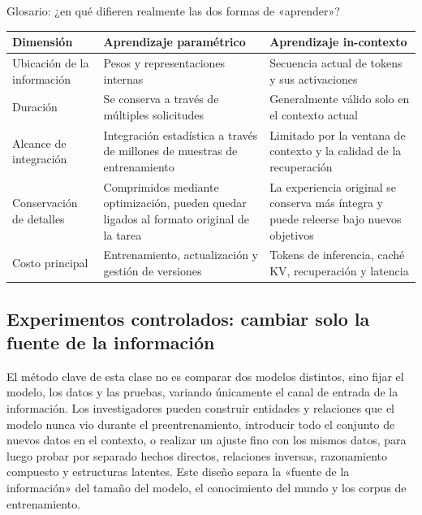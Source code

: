 \begin{knowledgebox}{Glosario: ¿en qué difieren realmente las dos formas de «aprender»?}
\begin{tabularx}{\textwidth}{L{0.22\textwidth}X X}
\toprule
Dimensión & Aprendizaje paramétrico & Aprendizaje in-contexto \\
\midrule
Ubicación de la información & Pesos y representaciones internas & Secuencia actual de tokens y sus activaciones \\
Duración & Se conserva a través de múltiples solicitudes & Generalmente válido solo en el contexto actual \\
Alcance de integración & Integración estadística a través de millones de muestras de entrenamiento & Limitado por la ventana de contexto y la calidad de la recuperación \\
Conservación de detalles & Comprimidos mediante optimización, pueden quedar ligados al formato original de la tarea & La experiencia original se conserva más íntegra y puede releerse bajo nuevos objetivos \\
Costo principal & Entrenamiento, actualización y gestión de versiones & Tokens de inferencia, caché KV, recuperación y latencia \\
\bottomrule
\end{tabularx}
\end{knowledgebox}

\subsection{Experimentos controlados: cambiar solo la fuente de la información}

El método clave de esta clase no es comparar dos modelos distintos, sino fijar el modelo, los datos y las pruebas, variando únicamente el canal de entrada de la información. Los investigadores pueden construir entidades y relaciones que el modelo nunca vio durante el preentrenamiento, introducir todo el conjunto de nuevos datos en el contexto, o realizar un ajuste fino con los mismos datos, para luego probar por separado hechos directos, relaciones inversas, razonamiento compuesto y estructuras latentes. Este diseño separa la «fuente de la información» del tamaño del modelo, el conocimiento del mundo y los corpus de entrenamiento.


